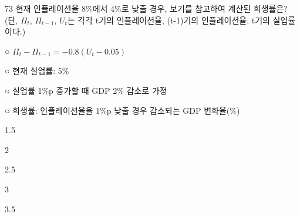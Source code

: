 \begin{question}{73}
현재 인플레이션율 8\%에서 4\%로 낮출 경우, 보기를 참고하여 계산된 희생률은? (단, $\Pi_t$, $\Pi_{t-1}$, $U_t$는 각각 t기의 인플레이션율, (t-1)기의 인플레이션율, t기의 실업률이다.)
\begin{bogi}
○ $\Pi_t-\Pi_{t-1}=-0.8(U_t-0.05)$ \par
○ 현재 실업률: 5\% \par
○ 실업률 1\%p 증가할 때 GDP 2\% 감소로 가정 \par
○ 희생률: 인플레이션율을 1\%p 낮출 경우 감소되는 GDP 변화율(\%) \par
\end{bogi}
\begin{choices}
  \item 1.5
  \item 2
  \item 2.5
  \item 3
  \item 3.5
\end{choices}
\end{question}
